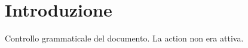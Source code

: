 

\primapagina

\section{Introduzione}
\label{sec:introduzione}

Controllo grammaticale del documento. La action non era attiva.

